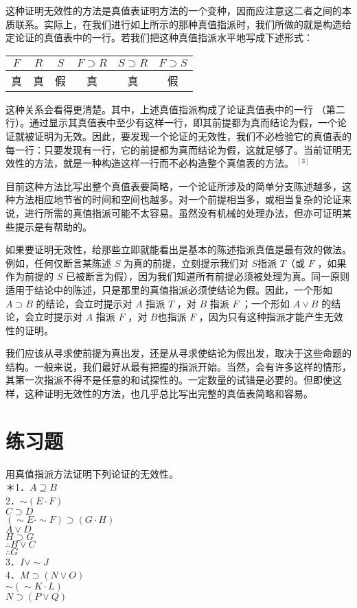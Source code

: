 这种证明无效性的方法是真值表证明方法的一个变种，因而应注意这二者之间的本质联系。实际上，在我们进行如上所示的那种真值指派时，我们所做的就是构造给定论证的真值表中的一行。若我们把这种真值指派水平地写成下述形式：

\begin{center}
\begin{tabular}{|cccccc|}
\hline
$F$ & $R$ & $S$ & $F \supset R$ & $S \supset R$ & $F \supset S$ \\
\hline
真 & 真 & 假 & 真 & 真 & 假 \\
\hline
\end{tabular}
\end{center}

这种关系会看得更清楚。其中，上述真值指派构成了论证真值表中的一行 （第二行）。通过显示其真值表中至少有这样一行，即其前提都为真而结论为假，一个论证就被证明为无效。因此，要发现一个论证的无效性，我们不必检验它的真值表的每一行：只要发现有一行，它的前提都为真而结论为假，这就足够了。当前证明无效性的方法，就是一种构造这样一行而不必构造整个真值表的方法。 ${ }^{[3]}$

目前这种方法比写出整个真值表要简略，一个论证所涉及的简单分支陈述越多，这种方法相应地节省的时间和空间也越多。对一个前提相当多，或相当复杂的论证来说，进行所需的真值指派可能不太容易。虽然没有机械的处理办法，但亦可证明某些提示是有帮助的。

如果要证明无效性，给那些立即就能看出是基本的陈述指派真值是最有效的做法。例如，任何仅断言某陈述 $S$ 为真的前提，立刻提示我们对 $S$指派 $T$（或 $F$ ，如果作为前提的 $S$ 已被断言为假），因为我们知道所有前提必须被处理为真。同一原则适用于结论中的陈述，只是那里的真值指派必须使结论为假。因此，一个形如 $A \supset B$ 的结论，会立时提示对 $A$ 指派 $T$ ，对 $B$ 指派 $F$ ；一个形如 $A \vee B$ 的结论，会立时提示对 $A$ 指派 $F$ ，对 $B$也指派 $F$ ，因为只有这种指派才能产生无效性的证明。

我们应该从寻求使前提为真出发，还是从寻求使结论为假出发，取决于这些命题的结构。一般来说，我们最好从最有把握的指派开始。当然，会有许多这样的情形，其第一次指派不得不是任意的和试探性的。一定数量的试错是必要的。但即使这样，这种证明无效性的方法，也几乎总比写出完整的真值表简略和容易。

\section*{练习题}
用真值指派方法证明下列论证的无效性。\\
＊1．$A \supseteq B$\\
2．$\sim(E \cdot F)$\\
$C \supset D$\\
$(\sim E \cdot \sim F) \supset(G \cdot H)$\\
$A \vee D$\\
$H \supset G$\\
$\therefore B \vee C$\\
$\therefore G$\\
3．$I \vee \sim J$\\
4．$M \supset(N \vee O)$\\
$\sim(\sim K \cdot L)$\\
$N \supset(P \vee Q)$


